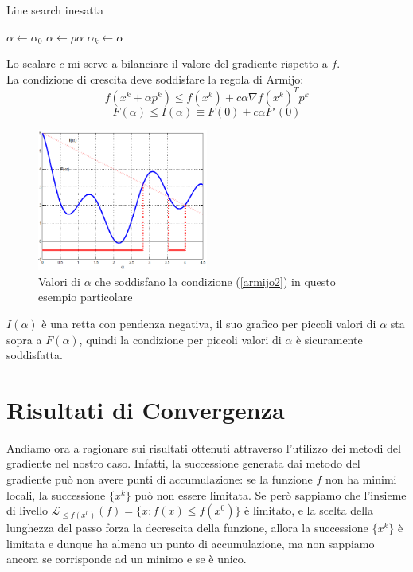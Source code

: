 \documentclass{report}
\begin{document}
\begin{algorithm}
\caption{Line search inesatta}\label{alg:euclid}
\begin{algorithmic}[1]
\State $\alpha \gets \alpha_0$
\State $\alpha \gets \rho\alpha$
\EndWhile
\State $\alpha_k \gets \alpha$
\EndProcedure
\end{algorithmic}
\end{algorithm}
Lo scalare $c$ mi serve a bilanciare il valore del gradiente rispetto a $f$.\\
La condizione di crescita deve soddisfare la regola di Armijo:
\begin{equation}
    \label{armijo1}
    f(x^k + \alpha p^k) \leqslant f(x^k) + c \alpha \nabla f(x^k)^T p^k
\end{equation}
\begin{equation}
    \label{armijo2}
         F( \alpha ) \leqslant I( \alpha ) \equiv F( 0 ) + c \alpha F'(0 )
\end{equation}
\begin{figure}[H]
  	\centering
	\includegraphics[width=0.5\textwidth]{Immagine_1}
    	\caption{Valori di $\alpha$ che soddisfano la condizione (\ref{armijo2}) in questo esempio particolare}
\end{figure}
$I( \alpha )$ è una retta con pendenza negativa, il suo grafico per piccoli valori di $\alpha$ sta sopra a $F( \alpha )$, quindi la condizione per piccoli valori di $\alpha$ è sicuramente soddisfatta.

\section{Risultati di Convergenza}
Andiamo ora a ragionare sui risultati ottenuti attraverso l'utilizzo dei metodi del gradiente nel nostro caso. Infatti, la successione generata dai metodo del gradiente può non avere punti di accumulazione: se la funzione $f$ non ha minimi locali, la successione $\{x^k\}$ può non essere limitata. Se però sappiamo che l'insieme di livello $\mathcal{L}_{\leqslant f(x^0)}(f) = \{x: f(x) \leqslant f(x^0)\}$ è limitato, e la scelta della lunghezza del passo forza la decrescita della funzione, allora la successione $\{x^k\}$ è limitata e dunque ha almeno un punto di accumulazione, ma non sappiamo ancora se corrisponde ad un minimo e se è unico.\\
\end{document}
